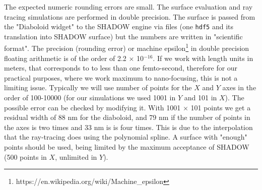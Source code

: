 \documentclass{iucr}              %
\begin{document}

 
The expected numeric rounding errors are small. The surface evaluation and ray tracing simulations are performed in double precision. The surface is passed from the "Diaboloid widget" to the SHADOW engine via files (one {\tt hdf5} and its translation into SHADOW surface) but the numbers are written in "scientific format". The precision (rounding error) or machine epsilon\footnote{ https://en.wikipedia.org/wiki/Machine\_epsilon} in double precision floating arithmetic is of the order of 2.2 $\times$ 10$^{-16}$. If we work with length units in meters, that corresponds to to less than one femto-second, therefore for our practical purposes, where we work maximum to nano-focusing, this is not a limiting issue. Typically we will use number of points for the $X$ and $Y$ axes in the order of 100-10000 (for our simulations we used 1001 in $Y$ and 101 in $X$). The possible error can be checked by modifying it. With 1001 $\times$ 101 points we get a residual width of 88 nm for the diaboloid, and 79 nm if the number of points in the axes is two times and 33 nm is is four times. This is due to the interpolation that the ray-tracing does using the polynomial spline. A surface with "enough" points should be used, being limited by the maximum acceptance of SHADOW (500 points in $X$, unlimited in $Y$). 
\end{document}
